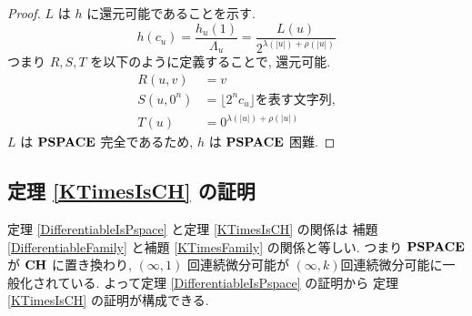 \begin{proof}
 $L$ は $h$ に還元可能であることを示す.
 \begin{equation}
  h(c_u) = \frac{h_u(1)}{\Lambda_u}
   = \frac{L(u)}{2^{\lambda(|u|)+\rho(|u|)}}
 \end{equation}
 つまり $R,S,T$ を以下のように定義することで, 還元可能.
 \begin{align}
  R(u,v) &= v \\
  S(u, 0^n) &= \lfloor 2^nc_u \rfloor \text{を表す文字列,} \\
  T(u) &= 0^{\lambda(|u|)+\rho(|u|)}
 \end{align}
 $L$ は $\mathbf{PSPACE}$ 完全であるため, $h$ は $\mathbf{PSPACE}$ 困難.
\end{proof}


\subsection{定理 \ref{KTimesIsCH} の証明}

定理 \ref{DifferentiableIsPspace} と定理 \ref{KTimesIsCH} の関係は
補題 \ref{DifferentiableFamily} と補題 \ref{KTimesFamily} の関係と等しい.
つまり $\mathbf{PSPACE}$ が $\mathbf{CH}$ に置き換わり,
$(\infty, 1)$ 回連続微分可能が $(\infty, k)$回連続微分可能に一般化されている.
よって定理 \ref{DifferentiableIsPspace} の証明から
定理 \ref{KTimesIsCH} の証明が構成できる.

